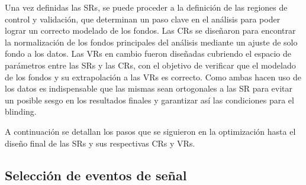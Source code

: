 Una vez definidas las SRs, se puede proceder a la definición de las regiones de control y validación, que determinan un paso clave en el análisis para poder lograr un correcto modelado de los fondos. Las CRs se diseñaron para encontrar la normalización de los fondos principales del análisis mediante un ajuste de solo fondo a los datos. Las VRs en cambio fueron diseñadas cubriendo el espacio de parámetros entre las SRs y las CRs, con el objetivo de verificar que el modelado de los fondos y su extrapolación a las VRs es correcto. Como ambas hacen uso de los datos es indispensable que las mismas sean ortogonales a las SR para evitar un posible sesgo en los resultados finales y garantizar así las condiciones para el blinding.

A continuación se detallan los pasos que se siguieron en la optimización hasta el diseño final de las SRs y sus respectivas CRs y VRs.

\subsection{Selección de eventos de señal}\label{sec:sig_selection}


